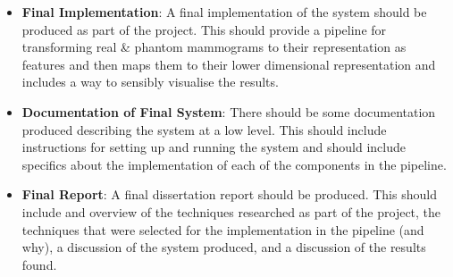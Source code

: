 \documentclass[11pt,fleqn,twoside]{article}
\begin{document}
\begin{itemize}
\item \textbf{Final Implementation}: A final implementation of the system should be produced as part of the project. This should provide a pipeline for transforming real  \& phantom mammograms to their representation as features and then maps them to their lower dimensional representation and includes a way to sensibly visualise the results.

\item \textbf{Documentation of Final System}: There should be some documentation produced describing the system at a low level. This should include instructions for setting up and running the system and should include specifics about the implementation of each of the components in the pipeline.

\item \textbf{Final Report}: A final dissertation report should be produced. This should include and overview of the techniques researched as part of the project, the techniques that were selected for the implementation in the pipeline (and why), a discussion of the system produced, and a discussion of the results found.

\end{itemize}

\nocite{*} %

\newpage
{} 

%
%

\renewcommand{\refname}{Annotated Bibliography}  %
\end{document}
